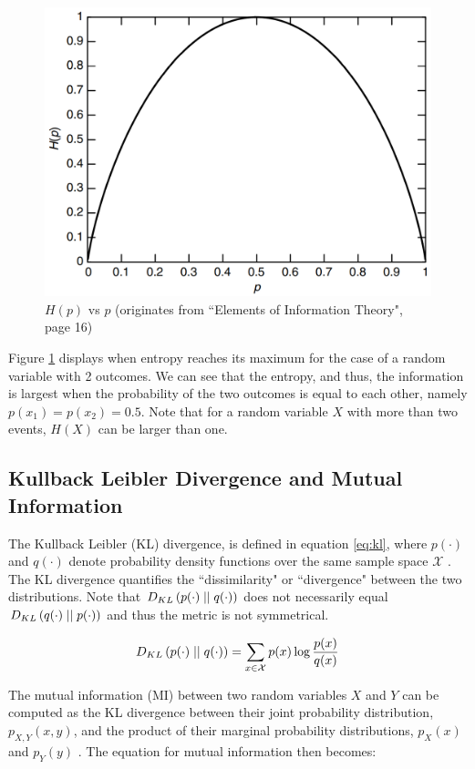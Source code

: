\begin{figure}[h]
	\centering
	\includegraphics[width=0.4\linewidth]{screenshot005}
	\caption{$H(p)$ vs $p$ (originates from ``Elements of Information Theory", page 16)}
	\label{fig:EntropyvsP}
\end{figure}



Figure \ref{fig:EntropyvsP} displays when entropy reaches its maximum for the case of a random variable with 2 outcomes. We can see that the entropy, and thus, the information is largest when the probability of the two outcomes is equal to each other, namely $p(x_1)=p(x_2)=0.5$. Note that for a random variable $X$ with more than two events, $H(X)$ can be larger than one.

\subsection{Kullback Leibler Divergence and Mutual Information} \label{cha:rel_entrop}
The Kullback Leibler (KL) divergence, is defined in equation \ref{eq:kl}, where $p(\cdot)$ and $q(\cdot)$ denote probability density functions over the same sample space $\mathcal{X}$ \citep{coverElementsInformationTheory2006}. The KL divergence quantifies the ``dissimilarity" or ``divergence" between the two distributions. Note that $D_{KL} \left( p(\cdot) \mid \mid q(\cdot) \right)$ does not necessarily equal $D_{KL} \left( q(\cdot) \mid \mid p(\cdot) \right)$ and thus the metric is not symmetrical.

\begin{equation}
	D_{KL} \left( p(\cdot) \mid \mid q(\cdot) \right) = \sum_{x\in\mathcal{X}}p(x) \log \frac{p(x)}{q(x)} \label{eq:kl}
\end{equation}



The mutual information (MI) between two random variables $X$ and $Y$ can be computed as the KL divergence between their joint probability distribution, $p_{X,Y}(x,y)$, and the product of their marginal probability distributions, $p_X(x)$ and $p_Y(y)$ \citep{coverElementsInformationTheory2006}. The equation for mutual information then becomes:

